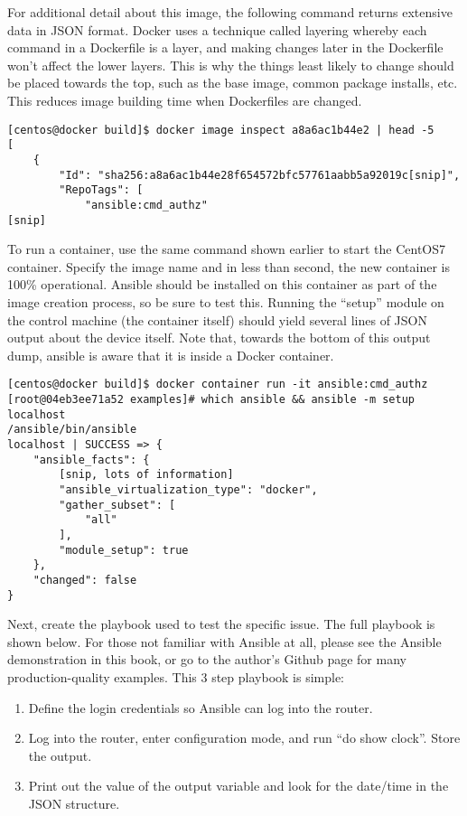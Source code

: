 For additional detail about this image, the following command returns
extensive data in JSON format. Docker uses a technique called layering whereby
each command in a Dockerfile is a layer, and making changes later in the
Dockerfile won't affect the lower layers. This is why the things least likely
to change should be placed towards the top, such as the base image, common
package installs, etc. This reduces image building time when Dockerfiles are
changed.

\begin{verbatim}
[centos@docker build]$ docker image inspect a8a6ac1b44e2 | head -5
[
    {
        "Id": "sha256:a8a6ac1b44e28f654572bfc57761aabb5a92019c[snip]",
        "RepoTags": [
            "ansible:cmd_authz"
[snip]
\end{verbatim}

To run a container, use the same command shown earlier to start the CentOS7
container. Specify the image name and in less than second, the new container
is 100\% operational. Ansible should be installed on this container as part of
the image creation process, so be sure to test this. Running the ``setup''
module on the control machine (the container itself) should yield several
lines of JSON output about the device itself. Note that, towards the bottom of
this output dump, ansible is aware that it is inside a Docker container.

\begin{verbatim}
[centos@docker build]$ docker container run -it ansible:cmd_authz
[root@04eb3ee71a52 examples]# which ansible && ansible -m setup localhost 
/ansible/bin/ansible
localhost | SUCCESS => {
    "ansible_facts": {
        [snip, lots of information]
        "ansible_virtualization_type": "docker", 
        "gather_subset": [
            "all"
        ], 
        "module_setup": true
    }, 
    "changed": false
}
\end{verbatim}

Next, create the playbook used to test the specific issue. The full playbook
is shown below. For those not familiar with Ansible at all, please see the
Ansible demonstration in this book, or go to the author's Github page for many
production-quality examples. This 3 step playbook is simple:

\begin{enumerate}
  \item Define the login credentials so Ansible can log into the router.
  \item Log into the router, enter configuration mode, and run ``do show
  clock''. Store the output.
  \item	Print out the value of the output variable and look for the date/time
  in the JSON structure.
\end{enumerate}

